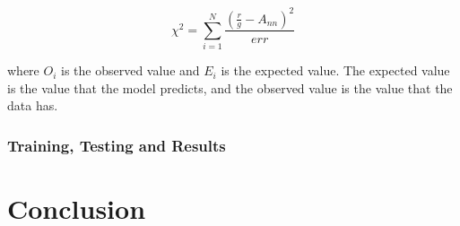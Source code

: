 \documentclass{article}
\begin{document}
\begin{equation}
    \chi^2 = \sum_{i=1}^{N} \frac{(\frac{r}{g} - A_{nn})^2}{err}
\end{equation}
    
where $O_i$ is the observed value and $E_i$ is the expected value. The expected value is the value that the model predicts, and the observed value is the value that the data has.


\subsubsection*{Training, Testing and Results}

\section{Conclusion}
\end{document}
